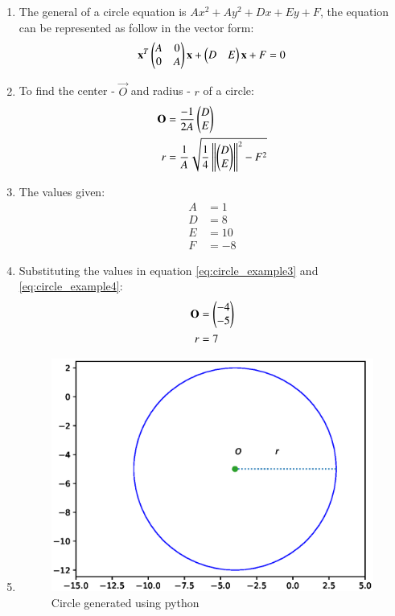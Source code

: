 \renewcommand{\theequation}{\theenumi}
\begin{enumerate}[label=\thesubsection.\arabic*.,ref=\thesubsection.\theenumi]

\item The general of a circle equation is $Ax^2 + Ay^2 + Dx + Ey + F$, the equation can be represented as follow in the vector form:
\begin{align}
\mathbf{x}^T 
\begin{pmatrix}
A & 0 \\
0 & A
\end{pmatrix}
\mathbf{x} + 
\begin{pmatrix}
D & E 
\end{pmatrix}
\mathbf{x} + F = 0
\end{align}

\item To find the center - $\vec{O}$ and radius - $r$ of a circle:
\begin{align}
\mathbf{O} &= \frac{-1}{2A}\begin{pmatrix}
D \\ E 
\end{pmatrix}\label{eq:circle_example3}\\
r &= \frac{1}{A}\sqrt{ \frac{1}{4} \left\lVert \begin{pmatrix}D\\ E\end{pmatrix} \right\rVert^2 - F^2}\label{eq:circle_example4}
\end{align}

\item The values given:
\begin{align}
A &= 1\\
D &= 8 \\
E &= 10 \\
F &= -8
\end{align}

\item Substituting the values in equation \ref{eq:circle_example3} and \ref{eq:circle_example4}:
\begin{align}
\mathbf{O} &= \begin{pmatrix}-4\\-5\end{pmatrix}\\
r &= 7
\end{align} 

\item 
\begin{figure}[!ht]
\centering
\includegraphics[width=\columnwidth]{./figs/circle_examp/circle.eps}
\caption{Circle generated using python}
\label{fig:circle2_circle_examp}
\end{figure} 


\end{enumerate}

